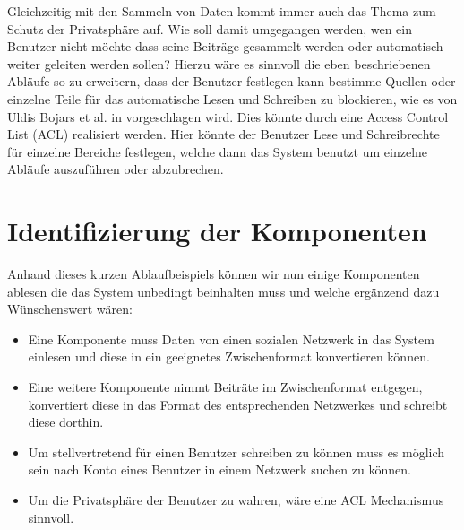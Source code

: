 Gleichzeitig mit den Sammeln von Daten kommt immer auch das Thema zum Schutz der Privatsphäre auf. Wie soll damit umgegangen werden, wen ein Benutzer nicht möchte dass seine Beiträge gesammelt werden oder automatisch weiter geleiten werden sollen? Hierzu wäre es sinnvoll die eben beschriebenen Abläufe so zu erweitern, dass der Benutzer festlegen kann bestimme Quellen oder einzelne Teile für das automatische Lesen und Schreiben zu blockieren, wie es von Uldis Bojars et al. in \cite{Bojars2011} vorgeschlagen wird. Dies könnte durch eine Access Control List (ACL) realisiert werden. Hier könnte der Benutzer Lese und Schreibrechte für einzelne Bereiche festlegen, welche dann das System benutzt um einzelne Abläufe auszuführen oder abzubrechen.


\section{Identifizierung der Komponenten} %
\label{sec:identifizierung_der_komponenten}

Anhand dieses kurzen Ablaufbeispiels können wir nun einige Komponenten ablesen die das System unbedingt beinhalten muss und welche ergänzend dazu Wünschenswert wären:

\begin{itemize} 
    \item Eine Komponente muss Daten von einen sozialen Netzwerk in das System einlesen und diese in ein geeignetes Zwischenformat konvertieren können.
    \item Eine weitere Komponente nimmt Beiträte im Zwischenformat entgegen, konvertiert diese in das Format des entsprechenden Netzwerkes und schreibt diese dorthin.
    \item Um stellvertretend für einen Benutzer schreiben zu können muss es möglich sein nach Konto eines Benutzer in einem Netzwerk suchen zu können.
    \item Um die Privatsphäre der Benutzer zu wahren, wäre eine ACL Mechanismus sinnvoll.
\end{itemize}   


